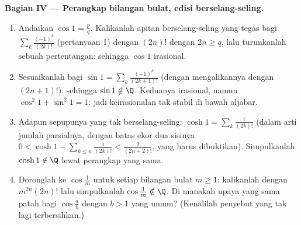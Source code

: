 \begin{problem}
\medskip
\noindent\textbf{Bagian IV --- Perangkap bilangan bulat, edisi
berselang-seling.}
\begin{enumerate}[resume]
  \item Andaikan $\cos 1 = \frac pq$. Kalikanlah apitan
        berselang-seling yang tegas bagi $\sum_{k}
        \frac{(-1)^k}{(2k)!}$ (pertanyaan 1) dengan $(2n)!$ dengan $2n
        \geq q$, lalu turunkanlah sebuah pertentangan: sehingga $\cos 1$
        irasional.
  \item Sesuaikanlah bagi $\sin 1 = \sum_k \frac{(-1)^k}{(2k+1)!}$
        (dengan mengalikannya dengan $(2n+1)!$): sehingga $\sin 1 \notin \Q$. Keduanya
        irasional, namun $\cos^2 1 + \sin^2 1 = 1$: jadi keirasionalan
        tak stabil di bawah aljabar.
  \item Adapun sepupunya yang tak berselang-seling: $\cosh 1 = \sum_k
        \frac{1}{(2k)!}$ (dalam arti jumlah parsialnya, dengan
        batas ekor dua sisinya $0 < \cosh 1 - \sum_{k \leq n}
        \frac{1}{(2k)!} < \frac{2}{(2n+2)!}$, yang harus dibuktikan).
        Simpulkanlah $\cosh 1 \notin \Q$ lewat perangkap yang sama.
  \item Doronglah ke $\cos\frac 1m$ untuk setiap bilangan bulat $m \geq 1$:
        kalikanlah dengan $m^{2n}(2n)!$ lalu simpulkanlah $\cos\frac1m
        \notin \Q$. Di manakah upaya yang sama patah bagi
        $\cos\frac ab$ dengan $b > 1$ yang umum? (Kenalilah
        penyebut yang tak lagi terbersihkan.)
\end{enumerate}


\end{problem}
